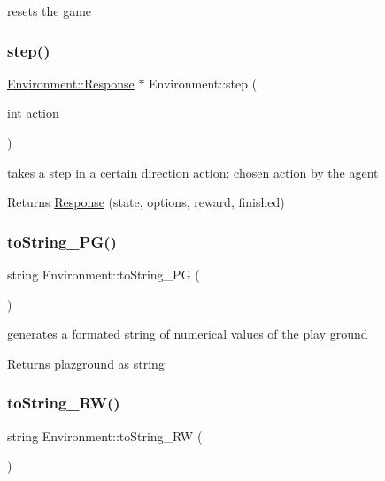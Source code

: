 resets the game \mbox{\label{class_environment_ab2531f3a79f25737da27ae5cac29ad05}} 
\subsubsection{\texorpdfstring{step()}{step()}}
{\footnotesize\ttfamily \mbox{\hyperlink{class_environment_1_1_response}{Environment\+::\+Response}} $\ast$ Environment\+::step (\begin{DoxyParamCaption}\item[{int}]{action }\end{DoxyParamCaption})}

takes a step in a certain direction  action\+: chosen action by the agent \begin{DoxyReturn}{Returns}
\mbox{\hyperlink{class_environment_1_1_response}{Response}} (state, options, reward, finished) 
\end{DoxyReturn}
\mbox{\label{class_environment_a7df8eab35d7ff6b7ce05eac019073ff1}} 
\subsubsection{\texorpdfstring{to\+String\+\_\+\+P\+G()}{toString\_PG()}}
{\footnotesize\ttfamily string Environment\+::to\+String\+\_\+\+PG (\begin{DoxyParamCaption}{ }\end{DoxyParamCaption})\hspace{0.3cm}{\ttfamily [inline]}}

generates a formated string of numerical values of the play ground \begin{DoxyReturn}{Returns}
plazground as string 
\end{DoxyReturn}
\mbox{\label{class_environment_aa542e4df56a2c6a2039fee9949052f0b}} 
\subsubsection{\texorpdfstring{to\+String\+\_\+\+R\+W()}{toString\_RW()}}
{\footnotesize\ttfamily string Environment\+::to\+String\+\_\+\+RW (\begin{DoxyParamCaption}{ }\end{DoxyParamCaption})\hspace{0.3cm}{\ttfamily [inline]}}

